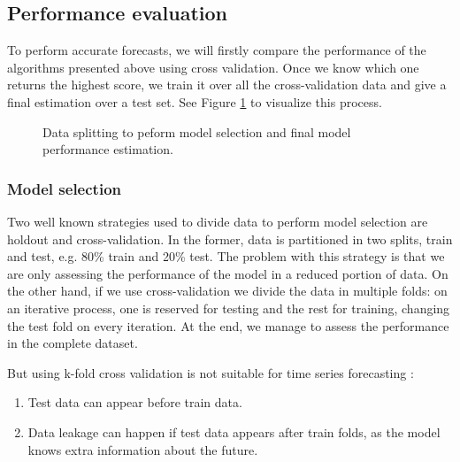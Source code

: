 \subsection{Performance evaluation}
To perform accurate forecasts, we will firstly compare the performance of the algorithms presented above using cross validation. Once we know which one returns the highest score, we train it over all the cross-validation data and give a final estimation over a test set. See Figure \ref{fig:cross-train-test} to visualize this process.

\begin{figure}[H]
\centering
    \caption{Data splitting to peform model selection and final model performance estimation.}
    \label{fig:cross-train-test}
\end{figure}

\subsubsection{Model selection}
Two well known strategies used to divide data to perform model selection are holdout and cross-validation.
In the former, data is partitioned in two splits, train and test, e.g. 80\% train and 20\% test.
The problem with this strategy is that we are only assessing the performance of the model in a reduced portion of data.
On the other hand, if we use cross-validation we divide the data in multiple folds: on an iterative process, one is reserved for testing and the rest for training, changing the test fold on every iteration.
At the end, we manage to assess the performance in the complete dataset.

\noindent But using k-fold cross validation is not suitable for time series forecasting \cite{cross-validation-types}:
\begin{enumerate}
    \item Test data can appear before train data.
    \item Data leakage can happen if test data appears after train folds, as the model knows extra information about the future.
\end{enumerate}

